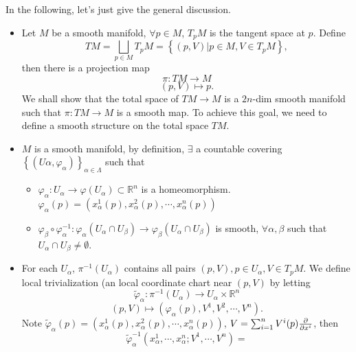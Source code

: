 \begin{enumerate}[(1)]
    In the following, let's just give the general discussion.
    \begin{itemize}
        \item Let \(M\) be a smooth manifold, \(\forall p\in M\), 
        \(T_p M\) is the tangent space at \(p\). Define
        \[
            TM=\bigsqcup_{p\in M}T_p M=\left\{(p,V)| p\in M, V\in 
            T_p M\right\}   
        ,\]
        then there is a projection map 
        \[
            \pi\colon TM\to M
            \]
        \[
            (p,V)\mapsto p.      
            \]
        We shall show that the total space of \(TM\to M\) is a \(2n\)-dim
        smooth manifold such that \(\pi\colon TM \to M\) is a smooth map. 
        To achieve this goal, we need to define a smooth structure on the 
        total space \(TM\).
        \item \(M\) is a smooth manifold, by definition, \(\exists\) a
        countable covering \(\left\{\left(U\alpha,\varphi_\alpha\right)
        \right\}_{\alpha\in \Lambda}\) such that
        \begin{itemize}
            \item \(\varphi_\alpha\colon U_\alpha\to \varphi
            \left(U_\alpha\right)\subset \mathbb{R}^n\) is a 
            homeomorphism. \(\varphi_\alpha(p)=\left(x^1_\alpha(p),
            x^2_\alpha(p),\cdots,x^n_\alpha(p)\right)\)
            \item \(\varphi_\beta\circ \varphi_\alpha^{-1}\colon
            \varphi_\alpha\left(U_\alpha\cap U_\beta\right)
            \to \varphi_\beta\left(U_\alpha\cap U_\beta\right)
            \)
            is smooth, \(\forall\alpha,\beta\) such that 
            \(U_\alpha\cap U_\beta\neq \emptyset\).
        \end{itemize}
        \item For each \(U_\alpha\), \(\pi^{-1}\left(U_\alpha\right)\)
        contains all pairs \((p,V),p\in U_\alpha,V\in T_p M\). We define
        local trivialization (an local coordinate chart near \((p,V)\) 
        by letting 
        \[
            \widetilde{\varphi}_\alpha\colon 
            \pi^{-1}\left(U_\alpha\right)\to U_\alpha\times 
            \mathbb{R}^n
        \]
        \[
            (p,V)\mapsto \left(\varphi_\alpha(p),V^1,V^2,\cdots,
            V^n\right).    
        \]
        Note \(\widetilde{\varphi}_\alpha(p)=\left(x^1_\alpha(p)
        ,x^2_\alpha(p),\cdots,x^n_\alpha(p)\right)\), 
        \(V=\sum_{i=1}^n V^i(p)\pdv{x^i}\), then
        \[\widetilde{\varphi}_\alpha^{-1}\left(x^1_\alpha
        ,\cdots,x^n_\alpha;V^1,\cdots,V^n\right)=
\]
\end{itemize}
\end{enumerate}
